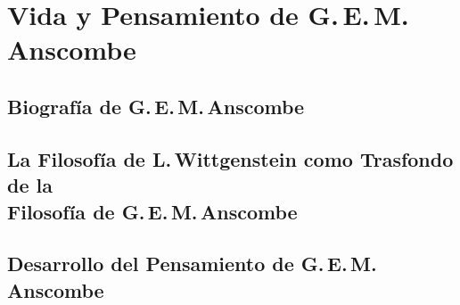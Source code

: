 \documentclass[../main.tex]{subfiles}
\begin{document}
\setcounter{chapter}{1}




%

%

%

%

\chapter{Vida y Pensamiento de G.\,E.\,M.\,Anscombe}
\section{Biografía de G.\,E.\,M.\,Anscombe}
%
\section{La Filosofía de L.\,Wittgenstein como Trasfondo de la\\Filosofía de
    G.\,E.\,M.\,Anscombe}
%
\section{Desarrollo del Pensamiento de G.\,E.\,M.\,Anscombe}
%
\end{document}
